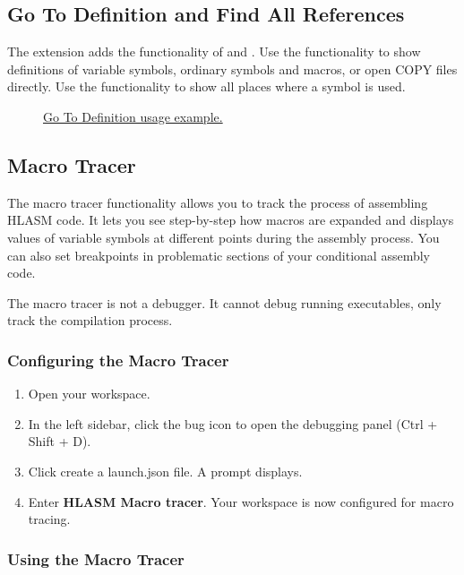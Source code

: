 \subsection{Go To Definition and Find All References}
The extension adds the functionality of  and . Use the  functionality to show definitions of variable symbols, ordinary symbols and macros, or open COPY files directly. Use the  functionality to show all places where a symbol is used.

\begin{figure}[H]
	\centering
	\caption{\href{https://github.com/eclipse/che-che4z-lsp-for-hlasm/blob/master/readme\_res/go\_to\_def.gif}{Go To Definition usage example.}}
\end{figure}

\subsection{Macro Tracer}
The macro tracer functionality allows you to track the process of assembling HLASM code. It lets you see step-by-step how macros are expanded and displays values of variable symbols at different points during the assembly process. You can also set breakpoints in problematic sections of your conditional assembly code. 

The macro tracer is not a debugger. It cannot debug running executables, only track the compilation process.

\subsubsection{Configuring the Macro Tracer}

\begin{enumerate}
	\item Open your workspace.
	\item In the left sidebar, click the bug icon to open the debugging panel (Ctrl + Shift + D).
	\item Click create a launch.json file. A  prompt displays.
	\item Enter \textbf{HLASM Macro tracer}. Your workspace is now configured for macro tracing.
\end{enumerate}

\subsubsection{Using the Macro Tracer}

